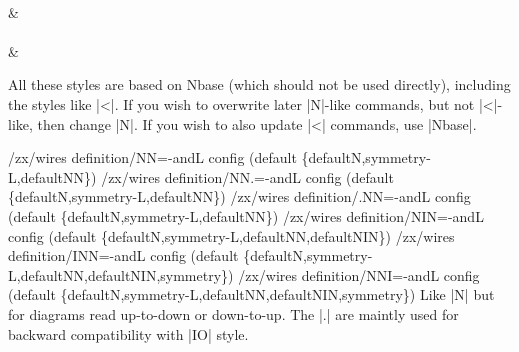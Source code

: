 \documentclass[a4paper,doc2]{ltxdoc} %
\begin{document}
{\begin{pgfmanualentry}
\begin{codeexample}[width=3cm]
  \begin{ZX}
    \zxX{\alpha} \ar[N,rd] \\
                               & \zxZ{\beta}\\
    \zxX{\alpha} \ar[N={L=1.2},rd] \\
                               & \zxZ{\beta}
  \end{ZX}
\end{codeexample}
All these styles are based on Nbase (which should not be used directly), including the styles like |<|. If you wish to overwrite later |N|-like commands, but not |<|-like, then change |N|. If you wish to also update |<| commands, use |Nbase|.
\end{pgfmanualentry}



\begin{pgfmanualentry}
  \makeatletter
  \def\extrakeytext{style, }
  \extractkey/zx/wires definition/NN=-andL config (default \{defaultN,symmetry-L,defaultNN\})\@nil%
  \extractkey/zx/wires definition/NN.=-andL config (default \{defaultN,symmetry-L,defaultNN\})\@nil%
  \extractkey/zx/wires definition/.NN=-andL config (default \{defaultN,symmetry-L,defaultNN\})\@nil%
  \extractkey/zx/wires definition/NIN=-andL config (default \{defaultN,symmetry-L,defaultNN,defaultNIN\})\@nil%
  \extractkey/zx/wires definition/INN=-andL config (default \{defaultN,symmetry-L,defaultNN,defaultNIN,symmetry\})\@nil%
  \extractkey/zx/wires definition/NNI=-andL config (default \{defaultN,symmetry-L,defaultNN,defaultNIN,symmetry\})\@nil%
  \makeatother
  \pgfmanualbody
  Like |N| but for diagrams read up-to-down or down-to-up. The |.| are maintly used for backward compatibility with |IO| style.
\end{pgfmanualentry}

}
\end{document}
